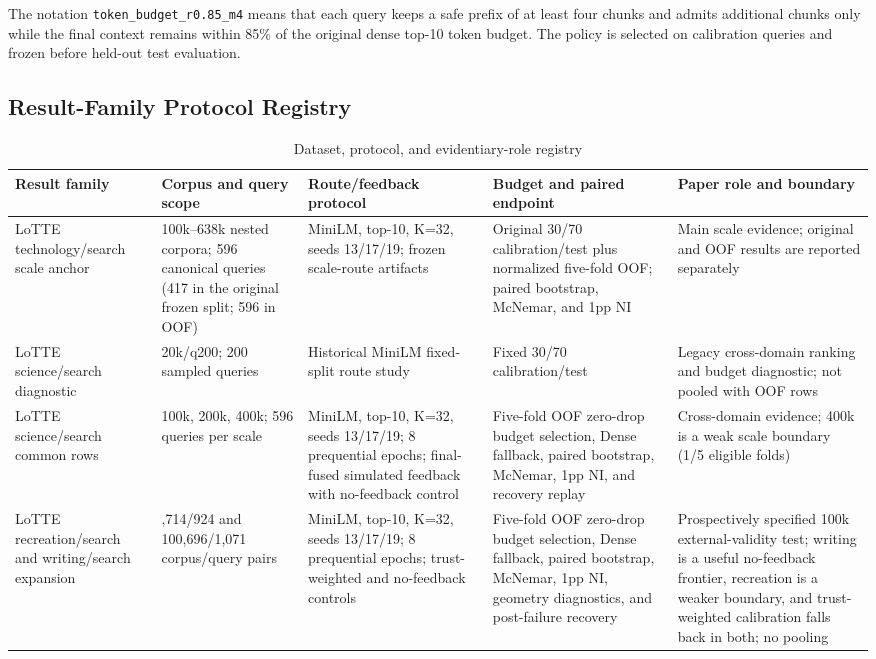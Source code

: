 The notation \nolinkurl{token_budget_r0.85_m4} means that each query keeps a safe prefix of at least four chunks and admits additional chunks only while the final context remains within 85\% of the original dense top-10 token budget. The policy is selected on calibration queries and frozen before held-out test evaluation.

\subsection{Result-Family Protocol Registry}
\label{sec:12-appendix:result-family-protocol-registry}

\begin{table}[pos=tbp]
\centering
\small
\caption{Dataset, protocol, and evidentiary-role registry}
\label{tab:s22}
\begin{tabularx}{\textwidth}{>{\raggedright\arraybackslash}X>{\raggedright\arraybackslash}X>{\raggedright\arraybackslash}X>{\raggedright\arraybackslash}X>{\raggedright\arraybackslash}X}
\toprule
Result family & Corpus and query scope & Route/feedback protocol & Budget and paired endpoint & Paper role and boundary \\
\midrule
LoTTE technology/search scale anchor & 100k--638k nested corpora; 596 canonical queries (417 in the original frozen split; 596 in OOF) & MiniLM, top-10, K=32, seeds 13/17/19; frozen scale-route artifacts & Original 30/70 calibration/test plus normalized five-fold OOF; paired bootstrap, McNemar, and 1pp NI & Main scale evidence; original and OOF results are reported separately \\
LoTTE science/search diagnostic & 20k/q200; 200 sampled queries & Historical MiniLM fixed-split route study & Fixed 30/70 calibration/test & Legacy cross-domain ranking and budget diagnostic; not pooled with OOF rows \\
LoTTE science/search common rows & 100k, 200k, 400k; 596 queries per scale & MiniLM, top-10, K=32, seeds 13/17/19; 8 prequential epochs; final-fused simulated feedback with no-feedback control & Five-fold OOF zero-drop budget selection, Dense fallback, paired bootstrap, McNemar, 1pp NI, and recovery replay & Cross-domain evidence; 400k is a weak scale boundary (1/5 eligible folds) \\
LoTTE recreation/search and writing/search expansion & 100,714/924 and 100,696/1,071 corpus/query pairs & MiniLM, top-10, K=32, seeds 13/17/19; 8 prequential epochs; trust-weighted and no-feedback controls & Five-fold OOF zero-drop budget selection, Dense fallback, paired bootstrap, McNemar, 1pp NI, geometry diagnostics, and post-failure recovery & Prospectively specified 100k external-validity test; writing is a useful no-feedback frontier, recreation is a weaker boundary, and trust-weighted calibration falls back in both; no pooling \\

\end{tabularx}
\end{table}
